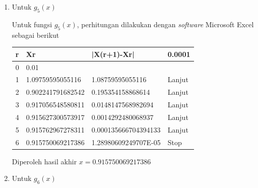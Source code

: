 \documentclass[12pt]{article}
\begin{document}
\begin{enumerate}
{\begin{enumerate}
{\begin{enumerate}
{\begin{lstlisting}
    
    Iteras 0
    
    x0 = -3
    f(x0) = -19
    
    x1 = 3.1622776601683795
    f(x1) = 187.1928851253882
    
    galat = 1.948683298050514
    
    
    Iteras 1
    
    x1 = 3.1622776601683795
    f(x1) = 187.1928851253882
    
    x2 = NaN
    f(x2) = NaN
    
    galat = NaN
    
    
    Solusi akhir = 3.1622776601683795
                        \end{lstlisting}
                        Diperoleh untuk $ x_0 = -3 $ perhitungan divergen
                    }
                \end{enumerate}
            }
            \item {
                Untuk $ g_5(x) $

                Untuk fungsi $ g_5(x) $, perhitungan dilakukan dengan \emph{software} Microsoft Excel sebagai berikut
                \begin{longtable}[c]{|l|l|l|l|}
                    \hline
                    r & Xr                & |X(r+1)-Xr|          & 0.0001 \\ \hline
                    \endfirsthead
                    \endhead
                    0 & 0.01              &                      &        \\ \hline
                    1 & 1.09759595055116  & 1.08759595055116     & Lanjut \\ \hline
                    2 & 0.902241791682542 & 0.195354158868614    & Lanjut \\ \hline
                    3 & 0.917056548580811 & 0.0148147568982694   & Lanjut \\ \hline
                    4 & 0.915627300573917 & 0.0014292480068937   & Lanjut \\ \hline
                    5 & 0.915762967278311 & 0.000135666704394133 & Lanjut \\ \hline
                    6 & 0.915750069217386 & 1.28980609249707E-05 & Stop   \\ \hline
                \end{longtable}
                Diperoleh hasil akhir $ x = 0.915750069217386 $
            }
            \item {
                Untuk $ g_6(x) $

}
\end{enumerate}}
\end{enumerate}
\end{document}
